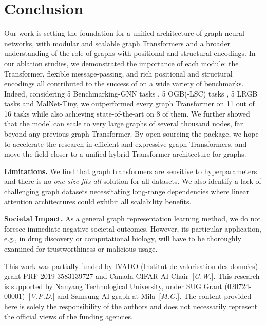 \documentclass{article}
\begin{document}
\vspace{-3pt}
\section{Conclusion}\label{sec:conclusion}
\vspace{-3pt}
Our work is setting the foundation for a unified architecture of graph neural networks, with modular and scalable graph Transformers and a broader understanding of the role of graphs with positional and structural encodings. In our ablation studies, we demonstrated the importance of each module: the Transformer, flexible message-passing, and rich positional and structural encodings all contributed to the success of \method on a wide variety of benchmarks. Indeed, considering 5 Benchmarking-GNN tasks \cite{dwivedi2020benchmarking}, 5 OGB(-LSC) tasks \cite{hu2020ogb,hu2021ogblsc}, 5 LRGB tasks \cite{dwivedi2022LRGB} and MalNet-Tiny, we outperformed every graph Transformer on 11 out of 16 tasks while also achieving state-of-the-art on 8 of them. We further showed that the model can scale to very large graphs of several thousand nodes, far beyond any previous graph Transformer. By open-sourcing the \gtgym package, we hope to accelerate the research in efficient and expressive graph Transformers, and move the field closer to a unified hybrid Transformer architecture for graphs.

\textbf{Limitations.} We find that graph transformers are sensitive to hyperparameters and there is no \emph{one-size-fits-all} solution for all datasets. We also identify a lack of challenging graph datasets necessitating long-range dependencies where linear attention architectures could exhibit all scalability benefits. 

\textbf{Societal Impact.} As a general graph representation learning method, we do not foresee immediate negative societal outcomes. However, its particular application, e.g., in drug discovery or computational biology, will have to be thoroughly examined for trustworthiness or malicious usage.


\begin{ack}
This work was partially funded by IVADO (Institut de valorisation des données) grant PRF-2019-3583139727 and Canada CIFAR AI Chair~[\emph{G.W.}]. This research is supported by Nanyang Technological University, under SUG Grant (020724-00001)~[\emph{V.P.D.}] and Samsung AI graph at Mila~[\emph{M.G.}]. The content provided here is solely the responsibility of the authors and does not necessarily represent the official views of the funding agencies.
\end{ack}
\end{document}
